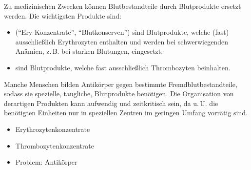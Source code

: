 { %
%
Zu medizinischen Zwecken können Blutbestandteile durch Blutprodukte ersetzt werden. Die wichtigsten Produkte sind:
\begin{itemize}
  \item {}
  (\protect\enquote{Ery-Konzentrate}, \enquote{Blutkonserven}) sind
  Blutprodukte, welche (fast) ausschließlich Erythrozyten
  enthalten und werden bei schwerwiegenden Anämien, z.\,B. bei starken Blutungen, eingesetzt.
  \item {} sind
  {Blutprodukte}, welche fast ausschließlich Thrombozyten
  beinhalten.
\end{itemize}
Manche Menschen bilden Antikörper gegen bestimmte Fremdblutbestandteile, sodass sie spezielle, taugliche, Blutprodukte benötigen. Die Organisation von derartigen Produkten kann aufwendig und zeitkritisch sein, da u.\,U. die benötigten Einheiten nur in speziellen Zentren im geringen Umfang vorrätig sind. 
}
{%
\begin{itemize}
  \item Erythrozytenkonzentrate
  \item Thrombozytenkonzentrate
  \item Problem: Antikörper
\end{itemize}
}





